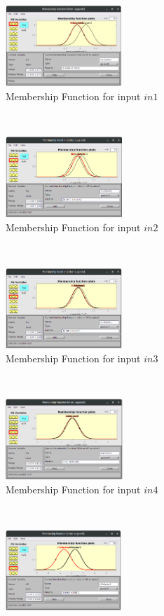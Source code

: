 \documentclass[11pt]{article}
\begin{document}
\begin{figure}[ht]
	\centering
	\begin{subfigure}[t]{0.3\textwidth}
		\centering
		\includegraphics[height=1.2in]{images/fcm_in1}
		\caption{Membership Function for input $in1$}
	\end{subfigure}
	~ 
	\begin{subfigure}[t]{0.3\textwidth}
		\centering
		\includegraphics[height=1.2in]{images/fcm_in2}
		\caption{Membership Function for input $in2$}
	\end{subfigure}
	~
	\begin{subfigure}[t]{0.3\textwidth}
		\centering
		\includegraphics[height=1.2in]{images/fcm_in3}
		\caption{Membership Function for input $in3$}
	\end{subfigure}
	\\
	\begin{subfigure}[t]{0.3\textwidth}
		\centering
		\includegraphics[height=1.2in]{images/fcm_in4}
		\caption{Membership Function for input $in4$}
	\end{subfigure}
	~ 
	\begin{subfigure}[t]{0.3\textwidth}
		\centering
		\includegraphics[height=1.2in]{images/fcm_in5}

\end{subfigure}
\end{figure}
\end{document}
